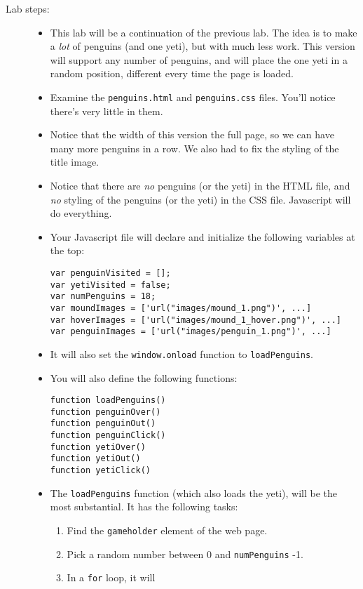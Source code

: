 \documentclass{article}
\begin{document}
\begin{description}
\item[Lab steps:]\mbox{}
  \begin{itemize}
  \item This lab will be a continuation of the previous lab.  The idea
    is to make a {\em lot} of penguins (and one yeti), but with much
    less work.  This version will support any number of penguins, and
    will place the one yeti in a random position, different every time
    the page is loaded.
  \item Examine the {\tt penguins.html} and {\tt penguins.css} files.
    You'll notice there's very little in them.
  \item Notice that the width of this version the full page, so we can have 
    many more    penguins in a row.  We also had to fix the styling of
    the title image.
  \item Notice that there are {\em no} penguins (or the yeti) in the
    HTML file, and {\em no} styling of the penguins (or the yeti) in
    the CSS file.  Javascript will do everything.
  \item Your Javascript file will declare and initialize the following
    variables at the top:
    \begin{Verbatim}[frame=single]
var penguinVisited = [];
var yetiVisited = false;
var numPenguins = 18;
var moundImages = ['url("images/mound_1.png")', ...]
var hoverImages = ['url("images/mound_1_hover.png")', ...]
var penguinImages = ['url("images/penguin_1.png")', ...]
\end{Verbatim}
    \item
    It will also set the {\tt window.onload} function to {\tt loadPenguins}.    
  \item You will also define the following functions:
    \begin{Verbatim}[frame=single]
function loadPenguins()
function penguinOver()
function penguinOut()
function penguinClick()
function yetiOver()
function yetiOut() 
function yetiClick() 
\end{Verbatim}      
    \item The {\tt loadPenguins} function (which also loads the yeti),
      will be the most substantial. It has the following tasks:
      \begin{enumerate}
      \item Find the {\tt gameholder} element of the web page.
      \item Pick a random number between 0 and {\tt numPenguins} -1.
      \item In a {\tt for} loop, it will

\end{enumerate}
\end{itemize}
\end{description}
\end{document}
